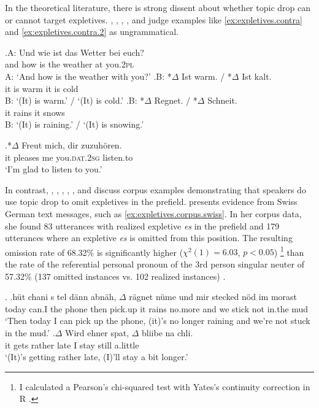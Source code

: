 In the theoretical literature, there is strong dissent about whether topic drop can or cannot target expletives. 
\citet[34]{fries1988}, \citet[81]{cardinaletti1990}, \citet[260]{kaiser2003}, \citet[116]{haegeman2007}, and \citet[213]{volodina.onea2012} judge examples like \ref{ex:expletives.contra} and \ref{ex:expletives.contra.2} as ungrammatical.

\exg.\label{ex:expletives.contra}A: Und wie ist das Wetter bei euch?\\
{} and how is the weather at you.\textsc{2pl}\\
A: `And how is the weather with you?'
\ag.B: *$\Delta$ Ist warm. / *$\Delta$ Ist kalt.\\
{} \phantom{*}it is warm {} \phantom{*}it is cold\\
B: `(It) is warm.' / `(It) is cold.'
\bg.B: *$\Delta$ Regnet. / *$\Delta$ Schneit. \\
{}  \phantom{*}it rains {} \phantom{*}it snows \\
B: `(It) is raining.'  / `(It) is snowing.'  \citep[34, his judgments]{fries1988}

\exg.*$\Delta$ Freut mich, dir zuzuhören.\label{ex:expletives.contra.2}\\
it pleases me you.\textsc{dat.2sg} listen.to\\
`I'm glad to listen to you.' \citep[34, his judgment]{fries1988}

In contrast, \citet[116]{poitou1993}, \citet[218]{reis2000}, \citet[271]{volodina2011}, \citet[120]{trutkowski2016}, \citet[67]{frick2017}, and \citet[220; 222--224]{ruppenhofer2018} discuss corpus  examples demonstrating that speakers do use topic drop to omit expletives  in the prefield.
\citet{frick2017} presents evidence from Swiss German text messages, such as \ref{ex:expletives.corpus.swiss}.
In her corpus data, she found 83 utterances with realized expletive \textit{es} in the prefield and 179 utterances where an expletive \textit{es} is omitted from this position.
The resulting omission rate of 68.32\% is significantly higher ($\chi^2(1) = 6.03$, $p < 0.05$)%
\footnote{I calculated a Pearson's chi-squared test with Yates's continuity correction in R \citep{rcoreteam2021}.}
than the rate of the referential personal pronoun of the 3rd person singular neuter of 57.32\% (137 omitted instances vs. 102 realized instances) \citep[140]{frick2017}.

\ex.\label{ex:expletives.corpus.swiss}
\ag.hüt chani s tel dänn abnäh, $\Delta$ rägnet nüme und mir stecked nöd im morast\\
today can.I the phone then pick.up it rains no.more and we stick not in.the mud\\
`Then today I can pick up the phone, (it)'s no longer raining and we're not stuck in the mud.' \citep[150]{frick2017}
\bg.$\Delta$ Wird ehner spat, $\Delta$ bliibe na chli.\\
it gets rather late I stay still a.little\\
`(It)'s getting rather late, (I)'ll stay a bit longer.' \citep[151]{frick2017}

